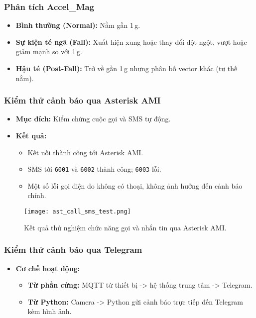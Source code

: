 \begin{frame}[fragile]
\frametitle{Phân tích Accel\_Mag}
\begin{itemize}
    \item \textbf{Bình thường (Normal):} Nằm gần 1\,g.
    \item \textbf{Sự kiện té ngã (Fall):} Xuất hiện xung hoặc thay đổi đột ngột, vượt hoặc giảm mạnh so với 1\,g.
    \item \textbf{Hậu té (Post-Fall):} Trở về gần 1\,g nhưng phân bố vector khác (tư thế nằm).
\end{itemize}
\end{frame}

\begin{frame}[fragile]
\frametitle{Kiểm thử cảnh báo qua Asterisk AMI}
\begin{itemize}
    \item \textbf{Mục đích:} Kiểm chứng cuộc gọi và SMS tự động.
    \item \textbf{Kết quả:}
    \begin{itemize}
        \item Kết nối thành công tới Asterisk AMI.
        \item SMS tới \texttt{6001} và \texttt{6002} thành công; \texttt{6003} lỗi.
        \item Một số lỗi gọi điện do không có thoại, không ảnh hưởng đến cảnh báo chính.
    \end{itemize}
\end{itemize}
\begin{figure}[H]
    \centering
    \texttt{[image: ast\_call\_sms\_test.png]}
    \caption{Kết quả thử nghiệm chức năng gọi và nhắn tin qua Asterisk AMI.}
\end{figure}
\end{frame}

\begin{frame}[fragile]
\frametitle{Kiểm thử cảnh báo qua Telegram}
\begin{itemize}
    \item \textbf{Cơ chế hoạt động:}
    \begin{itemize}
        \item \textbf{Từ phần cứng:} MQTT từ thiết bị -> hệ thống trung tâm -> Telegram.
        \item \textbf{Từ Python:} Camera -> Python gửi cảnh báo trực tiếp đến Telegram kèm hình ảnh.
    \end{itemize}
\end{itemize}
\end{frame}

